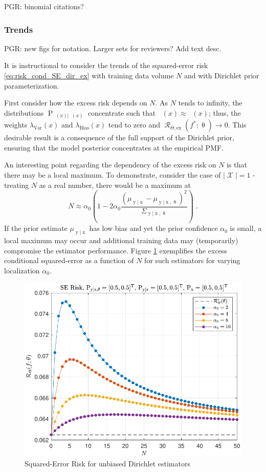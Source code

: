 \documentclass{article}
\DeclareMathOperator{\xrm}{\mathrm{x}}
\DeclareMathOperator{\yrm}{\mathrm{y}}
\DeclareMathOperator{\Prm}{\mathrm{P}}
\DeclareMathOperator{\Xcal}{\mathcal{X}}
\DeclareMathOperator{\Rcal}{\mathcal{R}}
\DeclareMathOperator{\thetam}{\theta_\text{m}}
\DeclareMathOperator{\upthetam}{\uptheta_\text{m}}
\DeclareMathOperator{\uppsim}{\uppsi_\text{m}}
\begin{document}
PGR: binomial citations?



\subsubsection{Trends}

PGR: new figs for notation. Larger sets for reviewers? Add text desc.


It is instructional to consider the trends of the squared-error risk \eqref{eq:risk_cond_SE_dir_ex} with training data volume $N$ and with Dirichlet prior parameterization. 

First consider how the excess risk depends on $N$. As $N$ tends to infinity, the distributions $\Prm_{\uppsim(x) | \upthetam(x)}$ concentrate such that $\uppsim(x) \approx \thetam(x)$; thus, the weights $\lambda_{\text{Var}}(x)$ and $\lambda_{\text{Bias}}(x)$ tend to zero and $\Rcal_{\Theta, \mathrm{ex}}(f^* ; \uptheta) \to 0$. This desirable result is a consequence of the full support of the Dirichlet prior, ensuring that the model posterior concentrates at the empirical PMF.

An interesting point regarding the dependency of the excess risk on $N$ is that there may be a local maximum. To demonstrate, consider the case of $|\Xcal| = 1$ - treating $N$ as a real number, there would be a maximum at 
\begin{equation}
N \approx \alpha_0 \left( 1 - 2 \alpha_0 \frac{\left( \mu_{\yrm | \xrm} - \mu_{\yrm | \xrm,\uptheta} \right)^2}{\Sigma_{\yrm | \xrm,\uptheta}} \right) \;.
\end{equation}
If the prior estimate $\mu_{\yrm | \xrm}$ has low bias and yet the prior confidence $\alpha_0$ is small, a local maximum may occur and additional training data may (temporarily) compromise the estimator performance. Figure \ref{fig:Risk_cond_SE_Dir_N_leg_a0_unbiased} exemplifies the excess conditional squared-error as a function of $N$ for such estimators for varying localization $\alpha_0$. 
\begin{figure}
	\centering
	\includegraphics[width=0.9\linewidth]{Risk_cond_SE_Dir_N_leg_a0_unbiased.pdf}
	\caption{Squared-Error Risk for unbiased Dirichlet estimators}
	\label{fig:Risk_cond_SE_Dir_N_leg_a0_unbiased}
\end{figure}
\end{document}
